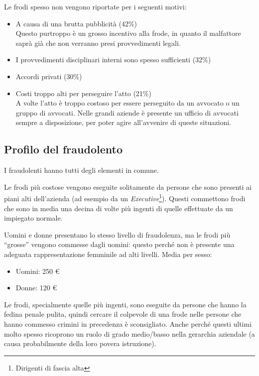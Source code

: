 Le frodi spesso non vengono riportate per i seguenti motivi:
\begin{itemize}
  \item A causa di una brutta pubblicità (42\%) \\
  Questo purtroppo è un grosso incentivo alla frode, in quanto il malfattore
  saprà già che non verranno presi provvedimenti legali.
  \item I provvedimenti disciplinari interni sono spesso sufficienti (32\%)
  \item Accordi privati (30\%)
  \item Costi troppo alti per perseguire l'atto (21\%) \\
  A volte l'atto è troppo costoso per essere perseguito da un avvocato o un
  gruppo di avvocati. Nelle grandi aziende è presente un ufficio di avvocati
  sempre a disposizione, per poter agire all'avvenire di queste situazioni.
\end{itemize}

\subsection{Profilo del fraudolento}

I fraudolenti hanno tutti degli elementi in comune.

Le frodi più costose vengono eseguite solitamente da persone che sono presenti
ai piani alti dell'azienda (ad esempio da un 
\textit{Executive}\footnote{Dirigenti di
fascia alta}). Questi commettono frodi che sono in media una decina di volte
più ingenti di quelle effettuate da un impiegato normale.

Uomini e donne presentano lo stesso livello di fraudolenza, ma le frodi più
``grosse'' vengono commesse dagli uomini: questo perché non è presente una
adeguata rappresentazione femminile ad alti livelli.
Media per sesso:
\begin{itemize}
  \item Uomini: 250 \euro
  \item Donne: 120 \euro
\end{itemize}

Le frodi, specialmente quelle più ingenti, sono eseguite da persone che hanno la fedina
penale pulita, quindi cercare il colpevole di una frode nelle persone che hanno commesso
 crimini in precedenza è sconsigliato. Anche perché questi ultimi molto spesso ricoprono 
un ruolo di grado medio/basso nella gerarchia aziendale (a causa probabilmente della 
loro povera istruzione).

